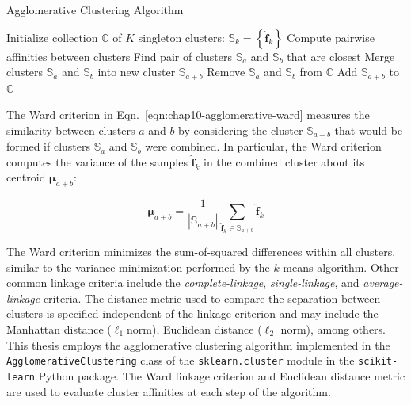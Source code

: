 \begin{algorithm}[h!]
\caption[Agglomerative Clustering Algorithm]{Agglomerative Clustering Algorithm}
\label{alg:chap10-agglomerative}
\begin{algorithmic}[1]
  \State Initialize collection $\mathbb{C}$ of $K$ singleton clusters: $\mathbb{S}_{k} = \left\{ \boldsymbol{\hat{f}}_{k} \right\}$
    \State Compute pairwise affinities between clusters 
    \State Find pair of clusters $\mathbb{S}_{a}$ and $\mathbb{S}_{b}$ that are closest %
    \State Merge clusters $\mathbb{S}_{a}$ and $\mathbb{S}_{b}$ into new cluster $\mathbb{S}_{a+b}$
    \State Remove $\mathbb{S}_{a}$ and $\mathbb{S}_{b}$ from $\mathbb{C}$
    \State Add $\mathbb{S}_{a+b}$ to $\mathbb{C}$
  \EndWhile
\end{algorithmic}
\end{algorithm}

\noindent The Ward criterion in Eqn.~\ref{eqn:chap10-agglomerative-ward} measures the similarity between clusters $a$ and $b$ by considering the cluster $\mathbb{S}_{a+b}$ that would be formed if clusters $\mathbb{S}_{a}$ and $\mathbb{S}_{b}$ were combined. In particular, the Ward criterion computes the variance of the samples $\boldsymbol{\hat{f}}_{k}$ in the combined cluster about its centroid $\boldsymbol{\mu}_{a+b}$:

\begin{equation}
\label{eqn:chap10-agglomerative-mean}
\boldsymbol{\mu}_{a+b} = \frac{1}{|\mathbb{S}_{a+b}|} \displaystyle\sum\limits_{\boldsymbol{\hat{f}}_{k} \in \mathbb{S}_{a+b}}  \boldsymbol{\hat{f}}_{k}
\end{equation}

The Ward criterion minimizes the sum-of-squared differences within all clusters, similar to the variance minimization performed by the $k$-means algorithm. Other common linkage criteria include the \textit{complete-linkage}, \textit{single-linkage}, and \textit{average-linkage} criteria. The distance metric used to compare the separation between clusters is specified independent of the linkage criterion and may include the Manhattan distance ($\ell_{1} $norm), Euclidean distance ($\ell_{2}$ norm), among others. This thesis employs the agglomerative clustering algorithm implemented in the \texttt{AgglomerativeClustering} class of the \texttt{sklearn.cluster} module in the \texttt{scikit-learn} Python package. The Ward linkage criterion and Euclidean distance metric are used to evaluate cluster affinities at each step of the algorithm.

